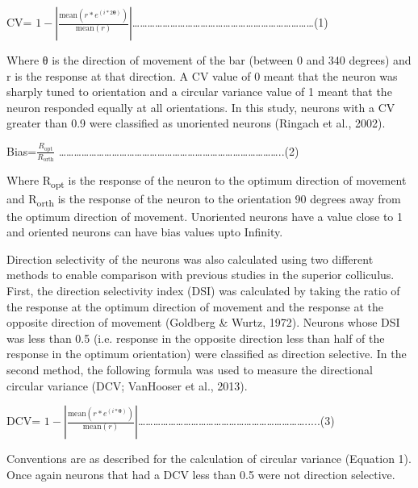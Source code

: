 CV=
\(1 - |\frac{\text{mean}\left( r*e^{(i*2\mathbf{\theta})} \right)}{\text{mean}\left( r \right)}|\)\ldots{}\ldots{}\ldots{}\ldots{}\ldots{}\ldots{}\ldots{}\ldots{}\ldots{}\ldots{}\ldots{}\ldots{}\ldots{}\ldots{}\ldots{}\ldots{}\ldots{}\ldots{}\ldots{}\ldots{}\ldots{}\ldots{}\ldots{}\ldots{}(1)

Where θ is the direction of movement of the bar (between 0 and 340
degrees) and r is the response at that direction. A CV value of 0 meant
that the neuron was sharply tuned to orientation and a circular variance
value of 1 meant that the neuron responded equally at all orientations.
In this study, neurons with a CV greater than 0.9 were classified as
unoriented neurons (Ringach et al., 2002).

Bias=\(\frac{R_{\text{opt}}}{R_{\text{orth}}}\)
\ldots{}\ldots{}\ldots{}\ldots{}\ldots{}\ldots{}\ldots{}\ldots{}\ldots{}\ldots{}\ldots{}\ldots{}\ldots{}\ldots{}\ldots{}\ldots{}\ldots{}\ldots{}\ldots{}\ldots{}\ldots{}\ldots{}\ldots{}\ldots{}\ldots{}\ldots{}\ldots{}\ldots{}\ldots{}..(2)

Where R\textsubscript{opt} is the response of the neuron to the optimum
direction of movement and R\textsubscript{orth} is the response of the
neuron to the orientation 90 degrees away from the optimum direction of
movement. Unoriented neurons have a value close to 1 and oriented
neurons can have bias values upto Infinity.

Direction selectivity of the neurons was also calculated using two
different methods to enable comparison with previous studies in the
superior colliculus. First, the direction selectivity index (DSI) was
calculated by taking the ratio of the response at the optimum direction
of movement and the response at the opposite direction of movement
(Goldberg \& Wurtz, 1972). Neurons whose DSI was less than 0.5 (i.e.
response in the opposite direction less than half of the response in the
optimum orientation) were classified as direction selective. In the
second method, the following formula was used to measure the directional
circular variance (DCV; VanHooser et al., 2013).

DCV=
\(1 - |\frac{\text{mean}\left( r*e^{\left( i*\mathbf{\theta} \right)} \right)}{\text{mean}\left( r \right)}|\)\ldots{}\ldots{}\ldots{}\ldots{}\ldots{}\ldots{}\ldots{}\ldots{}\ldots{}\ldots{}\ldots{}\ldots{}\ldots{}\ldots{}\ldots{}\ldots{}\ldots{}\ldots{}\ldots{}\ldots{}\ldots{}\ldots{}.....(3)

Conventions are as described for the calculation of circular variance
(Equation 1). Once again neurons that had a DCV less than 0.5 were not
direction selective.

